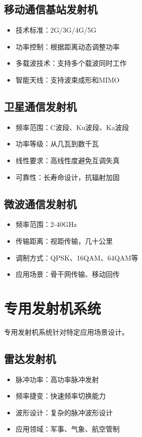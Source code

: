 \documentclass[12pt,UTF8]{ctexbook}
\begin{document}
\subsection{移动通信基站发射机}
\begin{itemize}[leftmargin=3.5em]
    \item 技术标准：2G/3G/4G/5G
    \item 功率控制：根据距离动态调整功率
    \item 多载波技术：支持多个载波同时工作
    \item 智能天线：支持波束成形和MIMO
\end{itemize}

\subsection{卫星通信发射机}
\begin{itemize}[leftmargin=3.5em]
    \item 频率范围：C波段、Ku波段、Ka波段
    \item 功率等级：从几瓦到数千瓦
    \item 线性要求：高线性度避免互调失真
    \item 可靠性：长寿命设计，抗辐射加固
\end{itemize}

\subsection{微波通信发射机}
\begin{itemize}[leftmargin=3.5em]
    \item 频率范围：2-40GHz
    \item 传输距离：视距传输，几十公里
    \item 调制方式：QPSK、16QAM、64QAM等
    \item 应用场景：骨干网传输、移动回传
\end{itemize}

\section{专用发射机系统}

专用发射机系统针对特定应用场景设计。

\subsection{雷达发射机}
\begin{itemize}[leftmargin=3.5em]
    \item 脉冲功率：高功率脉冲发射
    \item 频率捷变：快速频率切换能力
    \item 波形设计：复杂的脉冲波形设计
    \item 应用领域：军事、气象、航空管制
\end{itemize}
\end{document}
